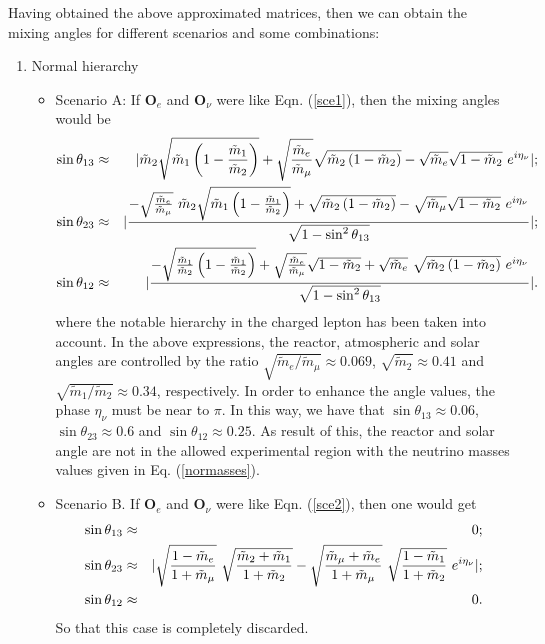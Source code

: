 \documentclass[aps,prd,groupaddress,floatfix,tighten,nofootinbib,showpacs,amsfonts,superscriptaddress]{revtex4-2}
\begin{document}
Having obtained the above approximated matrices, then we can obtain the mixing angles for different scenarios and some combinations:
\begin{enumerate}
	\item Normal hierarchy

\begin{itemize}
	\item Scenario A: If $\mathbf{O}_{e}$ and $\mathbf{O}_{\nu}$ were like Eqn. (\ref{sce1}), then the mixing angles would be 
	\begin{eqnarray}
	\sin{\theta_{13}}&\approx& \lvert \tilde{m}_{2}\sqrt{\tilde{m}_{1}\left(1-\frac{\tilde{m}_{1}}{\tilde{m}_{2}}\right)}+\sqrt{\frac{\tilde{m}_{e}}{\tilde{m}_{\mu}}}\sqrt{\tilde{m}_{2}\left(1-\tilde{m}_{2}\right)}-\sqrt{\tilde{m}_{e}}\sqrt{1-\tilde{m}_{2}}~ e^{i\eta_{\nu}} \rvert;\notag\\
	\sin{\theta_{23}}&\approx&\lvert \frac{-\sqrt{\frac{\tilde{m}_{e}}{\tilde{m}_{\mu}}}~\tilde{m}_{2}\sqrt{\tilde{m}_{1}\left(1-\frac{\tilde{m}_{1}}{\tilde{m}_{2}}\right)}+\sqrt{\tilde{m}_{2}\left(1-\tilde{m}_{2}\right)}-\sqrt{\tilde{m}_{\mu}}\sqrt{1-\tilde{m}_{2}}~ e^{i\eta_{\nu}}}{\sqrt{1-\sin^{2}{\theta_{13}}}}\rvert;\notag\\
	\sin{\theta_{12}}&\approx&\lvert \frac{-\sqrt{\frac{\tilde{m}_{1}}{\tilde{m}_{2}}\left(1-\frac{\tilde{m}_{1}}{\tilde{m}_{2}}\right)}+\sqrt{\frac{\tilde{m}_{e}}{\tilde{m}_{\mu}}}\sqrt{1-\tilde{m}_{2}}+\sqrt{\tilde{m}_{e}}~\sqrt{\tilde{m}_{2}\left(1-\tilde{m}_{2}\right)}~ e^{i\eta_{\nu}}}{\sqrt{1-\sin^{2}{\theta_{13}}}}\rvert.
	\end{eqnarray}
where the notable hierarchy in the charged lepton has been taken into account. In the above expressions, the reactor, atmospheric and solar angles are controlled by the ratio $\sqrt{\tilde{m}_{e}/\tilde{m}_{\mu}}\approx0.069$, $\sqrt{\tilde{m}_{2}}\approx 0.41$ and $\sqrt{\tilde{m}_{1}/\tilde{m}_{2}}\approx0.34$, respectively.  In order to enhance the angle values, the phase $\eta_{\nu}$ must be near to $\pi$. In this way, we have that $\sin{\theta_{13}}\approx0.06$, $\sin{\theta_{23}}\approx 0.6$ and $\sin{\theta_{12}}\approx 0.25$. As result of this, the reactor and solar angle are not in the allowed experimental region with the neutrino masses values given in Eq. (\ref{normasses}).
	\item Scenario B. If $\mathbf{O}_{e}$ and $\mathbf{O}_{\nu}$ were like Eqn. (\ref{sce2}), then 
	one would get
    \begin{eqnarray}
	\sin{\theta_{13}}&\approx& 0;\notag\\
	\sin{\theta_{23}}&\approx&\lvert \sqrt{\frac{1-\tilde{m}_{e}}{1+\tilde{m}_{\mu}}}~ \sqrt{\frac{\tilde{m}_{2}+\tilde{m}_{1}}{1+\tilde{m}_{2}}}-\sqrt{\frac{\tilde{m}_{\mu}+\tilde{m}_{e}}{1+\tilde{m}_{\mu}}}
	~\sqrt{\frac{1-\tilde{m}_{1}}{1+\tilde{m}_{2}}}~ e^{i\eta_{\nu}}\rvert;\notag\\
	\sin{\theta_{12}}&\approx&0.
	\end{eqnarray}
	So that this case is completely discarded.
	

\end{itemize}
\end{enumerate}
\end{document}

